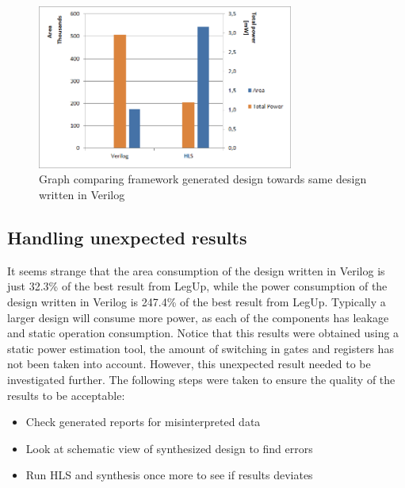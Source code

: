 \begin{figure}[hbpt]
\centering
\includegraphics[width=0.75\textwidth]{../figs/resultComparison1.png}
\caption{\label{fig:resultcomparisonhlsrun1}Graph comparing framework generated design towards same design written in Verilog}
\end{figure}

\subsection{Handling unexpected results}
It seems strange that the area consumption of the design written in Verilog is just 32.3\% of the best result from LegUp, while the power consumption of the design written in Verilog is 247.4\% of the best result from LegUp. Typically a larger design will consume more power, as each of the components has leakage and static operation consumption. Notice that this results were obtained using a static power estimation tool, the amount of switching in gates and registers has not been taken into account. However, this unexpected result needed to be investigated further. The following steps were taken to ensure the quality of the results to be acceptable:

\begin{itemize}
    \item Check generated reports for misinterpreted data
    \item Look at schematic view of synthesized design to find errors
    \item Run HLS and synthesis once more to see if results deviates
\end{itemize}

